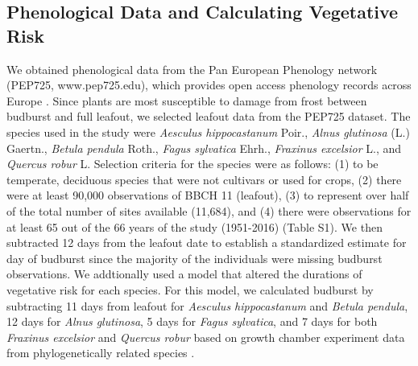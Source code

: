 \documentclass{article}\usepackage[]{graphicx}\usepackage[]{color}
\begin{document}
\subsection*{Phenological Data and Calculating Vegetative Risk}
We obtained phenological data from the Pan European Phenology network (PEP725, www.pep725.edu), which provides open access phenology records across Europe \citep{Templ2018}. Since plants are most susceptible to damage from frost between budburst and full leafout, we selected leafout data \citep[i.e., in][BBCH 11, which is defined as the point of leaf unfolding and the first visible leaf stalk]{Meier2001} from the PEP725 dataset. The species used in the study were \textit{Aesculus hippocastanum} Poir., \textit{Alnus glutinosa} (L.) Gaertn., \textit{Betula pendula} Roth., \textit{Fagus sylvatica} Ehrh., \textit{Fraxinus excelsior} L., and \textit{Quercus robur} L. Selection criteria for the species were as follows: (1) to be temperate, deciduous species that were not cultivars or used for crops, (2) there were at least 90,000 observations of BBCH 11 (leafout), (3) to represent over half of the total number of sites available (11,684), and (4) there were observations for at least 65 out of the 66 years of the study (1951-2016) (Table S1). We then subtracted 12 days from the leafout date to establish a standardized estimate for day of budburst \citep{Donnelly2017, Flynn2018, NPN2019} since the majority of the individuals were missing budburst observations. %
We addtionally used a model that altered the durations of vegetative risk for each species. For this model, we calculated budburst by subtracting 11 days from leafout for \textit{Aesculus hippocastanum} and \textit{Betula pendula}, 12 days for \textit{Alnus glutinosa}, 5 days for \textit{Fagus sylvatica}, and 7 days for both \textit{Fraxinus excelsior} and \textit{Quercus robur} based on growth chamber experiment data from phylogenetically related species \citep{Buerki2010, Wang2016, Hipp2017, Flynn2018}.
\end{document}
